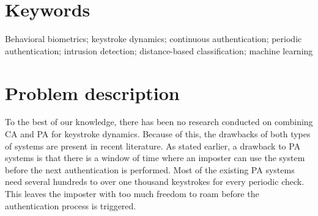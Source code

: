 \documentclass[informationsecurity]{gucmasterproject}
\begin{document}
\section{Keywords}
Behavioral biometrics; keystroke dynamics; continuous authentication; periodic authentication; intrusion detection; distance-based classification; machine learning 
%

\section{Problem description}
To the best of our knowledge, there has been no research conducted on combining CA and PA for keystroke dynamics.
Because of this, the drawbacks of both types of systems are present in recent literature.
As stated earlier, a drawback to PA systems is that there is a window of time where an imposter can use the system before the next authentication is performed.
Most of the existing PA systems need several hundreds to over one thousand keystrokes for every periodic check.
This leaves the imposter with too much freedom to roam before the authentication process is triggered.
\end{document}
